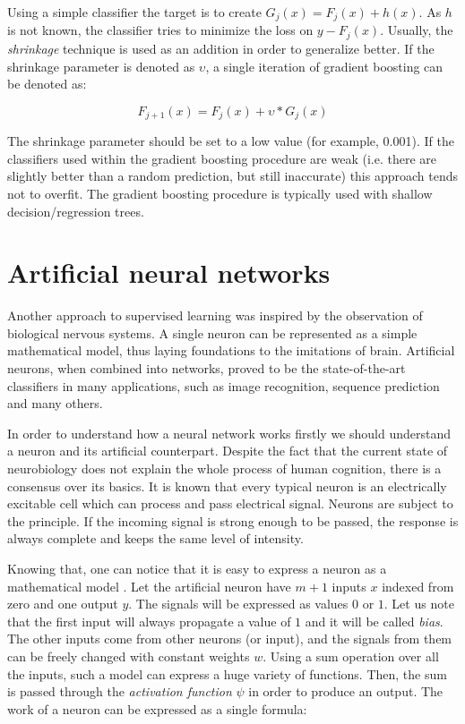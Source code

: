 \documentclass{pracamgr}
\begin{document}
Using a simple classifier the target is to create $G_{j}(x) = F_{j}(x) + h(x)$. As
$h$ is not known, the classifier tries to minimize the loss on $y - F_{j}(x)$.
Usually, the \textit{shrinkage} technique is used as an addition in order to
generalize better. If the shrinkage parameter is denoted as $\upsilon$,
a single iteration of gradient boosting can be denoted as:

\begin{equation}
F_{j+1}(x) = F_{j}(x) + \upsilon * G_{j}(x)
\end{equation}

The shrinkage parameter should be set to a low value (for example, 0.001). If the
classifiers  used within the gradient boosting procedure are weak (i.e.
there are slightly better than a random prediction, but still inaccurate)
\citep{schapire1990thestrength} this approach tends not to overfit. The gradient boosting
procedure is typically used with shallow decision/regression trees.

\section{Artificial neural networks}
Another approach to supervised learning was inspired by the observation of biological
nervous systems. A single neuron can be represented as a simple mathematical model,
thus laying foundations to the imitations of brain. Artificial neurons, when combined
into networks, proved to be the state-of-the-art classifiers in many applications, such
as image recognition, sequence prediction and many others.

In order to understand how a neural network works firstly we should understand a neuron
and its artificial counterpart. Despite the fact that the current state of
neurobiology does not explain the whole process of human cognition, there is a
consensus \citep{PNS} over its basics. It is known that every typical neuron is an
electrically excitable cell which can process and pass electrical signal.
Neurons are subject to the 
principle. If the incoming signal is strong enough to be passed, the response
is always complete and keeps the same level of intensity.

Knowing that, one can notice that it is easy to express a neuron as a mathematical
model \citep{McCulloch1943}. Let the artificial neuron have $m + 1$ inputs $x$ indexed
from zero and one
output $y$. The signals will be expressed as values $0$ or $1$. Let us note
that the first input will always propagate a value of $1$ and it will be called
\textit{bias}. The other inputs come from other neurons (or input), and the
signals from them can be freely changed with constant weights $w$. Using a sum
operation over all the inputs, such a model can express a huge variety of functions.
Then, the sum is passed through the \textit{activation function} $\psi$ in order to produce 
an output. The work of a neuron can be expressed as a single formula:
\end{document}
